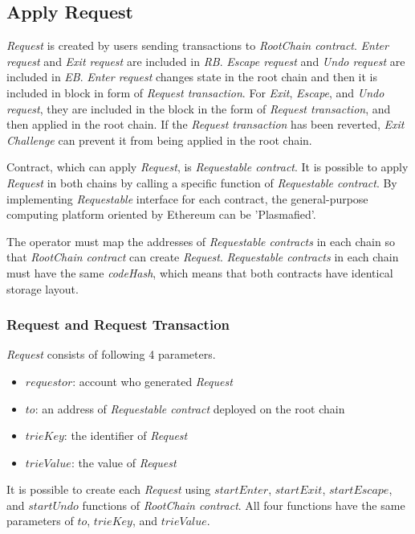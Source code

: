\documentclass[letterpaper, 11pt]{article}
\begin{document}
\subsection{Apply Request}
\begin{CJK}{UTF8}{mj}
\emph{Request} is created by users sending transactions to \emph{RootChain contract}. \emph{Enter request} and \emph{Exit request} are included in \emph{RB}. \emph{Escape request} and \emph{Undo request} are included in \emph{EB}. \emph{Enter request} changes state in the root chain and then it is included in block in form of \emph{Request transaction}. For \emph{Exit}, \emph{Escape}, and \emph{Undo request}, they are included in the block in the form of \emph{Request transaction}, and then applied in the root chain. If the \emph{Request transaction} has been reverted, \emph{Exit Challenge} can prevent it from being applied in the root chain.

Contract, which can apply \emph{Request}, is \emph{Requestable contract}. It is possible to apply \emph{Request} in both chains by calling a specific function of \emph{Requestable contract}. By implementing \emph{Requestable} interface for each contract, the general-purpose computing platform oriented by Ethereum can be 'Plasmafied'.

The operator must map the addresses of \emph{Requestable contracts} in each chain so that \emph{RootChain contract} can create \emph{Request}. \emph{Requestable contracts} in each chain must have the same \emph{codeHash}, which means that both contracts have identical storage layout.


\subsubsection{Request and Request Transaction}
\begin{CJK}{UTF8}{mj}
\emph{Request} consists of following 4 parameters.
\begin{itemize}
\item $requestor$: account who generated \emph{Request}
\item $to$: an address of \emph{Requestable contract} deployed on the root chain
\item $trieKey$: the identifier of \emph{Request}
\item $trieValue$: the value of \emph{Request}
\end{itemize}
It is possible to create each \emph{Request} using $startEnter$, $startExit$, $startEscape$, and $startUndo$ functions of \emph{RootChain contract}. All four functions have the same parameters of $to$, $trieKey$, and $trieValue$.


\end{CJK}
\end{CJK}
\end{document}
